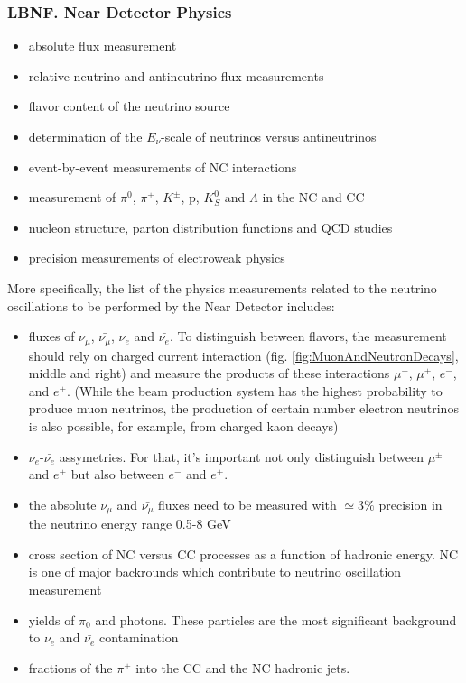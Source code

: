 \begin{frame}\frametitle{LBNF. Near Detector Physics}
\scriptsize
\tiny
\begin{itemize}
  \item absolute flux measurement
  \item relative neutrino and antineutrino flux measurements
  \item flavor content of the neutrino source
  \item determination of the $E_\nu$-scale of neutrinos versus antineutrinos
  \item event-by-event measurements of NC interactions
  \item measurement of $\pi^0$, $\pi^\pm$, $K^\pm$, p, $K^0_S$ and $\Lambda$ in the NC and CC
  \item nucleon structure, parton distribution functions and QCD studies
  \item precision measurements of electroweak physics
\end{itemize}

More specifically, the list of the physics measurements related to the neutrino oscillations to be performed by the Near Detector includes:
\begin{itemize}
  \item fluxes of $\nu_\mu$, $\bar{\nu_\mu}$, $\nu_e$ and $\bar{\nu_e}$. To distinguish between flavors, the measurement should rely on charged current interaction (fig. \ref{fig:MuonAndNeutronDecays}, middle and right) and measure the products of these interactions $\mu^-$, $\mu^+$, $e^-$, and $e^+$. (While the beam production system has the highest probability to produce muon neutrinos, the production of certain number electron neutrinos is also possible, for example, from charged kaon decays)
  \item $\nu_e$-$\bar{\nu_e}$ assymetries. For that, it's important not only distinguish between $\mu^\pm$ and $e^\pm$ but also between $e^-$ and $e^+$.
  \item the absolute $\nu_\mu$ and $\bar{\nu_\mu}$ fluxes need to be measured with $\simeq{3\%}$ precision in the neutrino energy range 0.5-8 GeV
  \item cross section of NC versus CC processes as a function of hadronic energy. NC is one of major backrounds which contribute to neutrino oscillation measurement
  \item yields of $\pi_0$ and photons. These particles are the most significant background to $\nu_e$ and $\bar{\nu_e}$ contamination
  \item fractions of the $\pi^\pm$ into the CC and the NC hadronic jets.    
\end{itemize} 
\end{frame}

